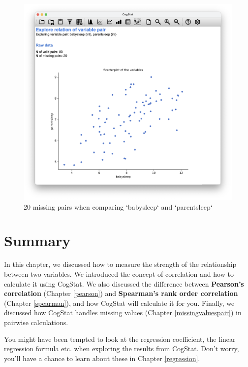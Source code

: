 \documentclass[
  11pt,
]{book}
\theoremstyle{definition}
\theoremstyle{definition}
\theoremstyle{definition}
\theoremstyle{definition}
\theoremstyle{remark}
\begin{document}
\begin{figure}

{\centering \includegraphics[width=0.66\linewidth]{resources/image/cogstatparentsleepbabysleepmissing} 

}

\caption{20 missing pairs when comparing `babysleep` and `parentsleep`}\label{fig:parenthoodmissingcog3}
\end{figure}

\hypertarget{summary-1}{%
\section{Summary}\label{summary-1}}

In this chapter, we discussed how to measure the strength of the relationship between two variables. We introduced the concept of correlation and how to calculate it using CogStat. We also discussed the difference between \textbf{Pearson's correlation} (Chapter \ref{pearson}) and \textbf{Spearman's rank order correlation} (Chapter \ref{spearman}), and how CogStat will calculate it for you. Finally, we discussed how CogStat handles missing values (Chapter \ref{missingvaluespair}) in pairwise calculations.

You might have been tempted to look at the regression coefficient, the linear regression formula etc. when exploring the results from CogStat. Don't worry, you'll have a chance to learn about these in Chapter \ref{regression}.
\end{document}
